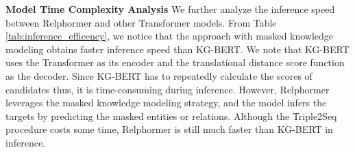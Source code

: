 \documentclass[sigconf]{acmart}
\begin{document}
 
\begin{table}[!t]

    \caption{\textbf{Inference efficiency comparison.} 
    ,  and  are numbers of  entities, relations, inference samples in the graph respectively.
     is the length of input sequence.
    The time refers to the speed of inference time given a single (entity, relation) on FB15K-237.
    } 

    \centering
   
     \label{tab:inference_efficency}


\end{table} 





\textbf{Model Time Complexity Analysis}
\label{sec:time}
We further analyze the inference speed between Relphormer and other Transformer models.
From Table \ref{tab:inference_efficency}, we notice that the approach with masked knowledge modeling obtains faster inference speed than KG-BERT.
We note that KG-BERT uses the Transformer as its encoder and the translational distance score function as the decoder.
Since KG-BERT has to repeatedly calculate the scores of candidates thus, it is time-consuming during inference.
However, Relphormer leverages the masked knowledge modeling strategy, and the model infers the targets by predicting the masked entities or relations. 
Although the Triple2Seq procedure costs some time, Relphormer is still much faster than KG-BERT in inference.
\end{document}
